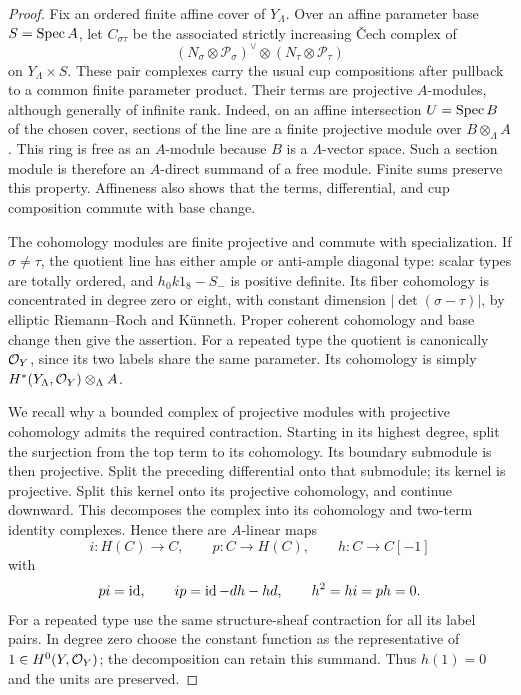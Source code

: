\begin{proof}
Fix an ordered finite affine cover of $Y_\Lambda$.  Over an affine
parameter base $S=\operatorname{Spec} A$, let $C_{\sigma\tau}$ be the associated
strictly increasing \v Cech complex of
\[
 (N_\sigma\otimes\mathcal P_\sigma)^\vee
          \otimes(N_\tau\otimes\mathcal P_\tau)
\]
on $Y_\Lambda\times S$.  These pair complexes carry the usual cup
compositions after pullback to a common finite parameter product.
Their terms are projective $A$-modules, although generally of
infinite rank.  Indeed, on an affine intersection $U=\operatorname{Spec} B$ of
the chosen cover, sections of the line are a finite projective
module over $B\otimes_\Lambda A$.  This ring is free as an
$A$-module because $B$ is a $\Lambda$-vector space.  Such a section
module is therefore an $A$-direct summand of a free module.  Finite
sums preserve this property.  Affineness also shows that the terms,
differential, and cup composition commute with base change.

The cohomology modules are finite projective and commute with
specialization.  If $\sigma\ne\tau$, the quotient line has either
ample or anti-ample diagonal type: scalar types are totally ordered,
and $h_0k1_8-S_-$ is positive definite.  Its fiber cohomology is
concentrated in degree zero or eight, with constant dimension
$|\det(\sigma-\tau)|$, by elliptic Riemann--Roch and K\"unneth.
Proper coherent cohomology and base change then give the assertion.
For a repeated type the quotient is canonically $\mathcal O_Y$, since its
two labels share the same parameter.  Its cohomology is simply
$H^*(Y_\Lambda,\mathcal O_Y)\otimes_\Lambda A$.

We recall why a bounded complex of projective modules with
projective cohomology admits the required contraction.  Starting
in its highest degree, split the surjection from the top term to
its cohomology.  Its boundary submodule is then projective.  Split
the preceding differential onto that submodule; its kernel is
projective.  Split this kernel onto its projective cohomology, and
continue downward.  This decomposes the complex into its cohomology
and two-term identity complexes.  Hence there are $A$-linear maps
\[
 i:H(C)\to C,\qquad p:C\to H(C),\qquad h:C\to C[-1]
\]
with
\begin{equation}
 pi=\operatorname{id},\qquad ip=\operatorname{id}-dh-hd,\qquad
 h^2=hi=ph=0.
 \label{mirror:contraction}
\end{equation}
For a repeated type use the same structure-sheaf contraction for
all its label pairs.  In degree zero choose the constant function
as the representative of $1\in H^0(Y,\mathcal O_Y)$; the decomposition
can retain this summand.  Thus $h(1)=0$ and the units are preserved.


\end{proof}
